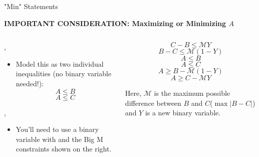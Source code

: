 \documentclass[10pt, aspectratio=169]{beamer}
\begin{document}
\begin{frame}[t]{"Min" Statements}
    \begin{center}
        \textbf{IMPORTANT CONSIDERATION: Maximizing or Minimizing $A$}
    \end{center}
    \begin{columns}[t]
        \begin{column}[t]{0.5\textwidth}
            \vspace{-.8cm}
            \begin{center}
                ,
                \underbar{}
            \end{center}
            \vspace{-0.4cm}
            \begin{itemize}
                \item Model this as two individual inequalities (no binary variable needed!):
                $$A \leq B$$
                $$A \leq C$$
            \end{itemize}
            \begin{center}
                ,
            \end{center}
            \begin{itemize}
                \item You'll need to use a binary variable with and the Big M constraints shown on the right.
            \end{itemize}
        \end{column}
        \begin{column}[t]{0.5\textwidth}
                $$C - B \leq \mathcal{M} Y$$
                $$B - C \leq \mathcal{M} (1-Y)$$
                $$A \leq B$$
                $$A \leq C$$
                $$A \geq B - \mathcal{M}(1-Y)$$
                $$A \geq C - \mathcal{M}Y$$

                Here, $\mathcal{M}$ is the maximum possible difference between $B$ and $C$($\max{\left|B-C\right|}$) and $Y$ is a new binary variable.
        \end{column}
    \end{columns}
\end{frame}
\end{document}
